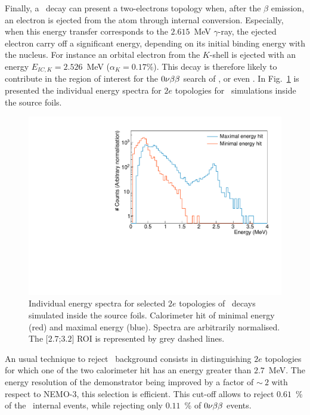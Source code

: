 Finally, a \Tl\ decay can present a two-electrons topology when, after the $\beta$ emission, an electron is ejected from the atom through internal conversion.
Especially, when this energy transfer corresponds to the $2.615$~MeV $\gamma$-ray, the ejected electron carry off a significant energy, depending on its initial binding energy with the nucleus.
For instance an orbital electron from the $K$-shell is ejected with an energy $E_{IC,K}=2.526$~MeV (${\alpha_{K}=0.17}$\%).
This decay is therefore likely to contribute in the region of interest for the $0\nu\beta\beta$ search of \Se, or even \Nd.
In Fig.~\ref{fig:Emin_Emax_Tl} is presented the individual energy spectra for $2e$ topologies for \Tl\ simulations inside the source foils.
\begin{figure}[!h]
  \centering
  \includegraphics[width=13cm]{timedifference/fig_timediff/energy_spect_min_max_208Tl.pdf}
  \caption{Individual energy spectra for selected $2e$ topologies of \Tl\ decays simulated inside the source foils.
    Calorimeter hit of minimal energy (red) and maximal energy (blue).
    Spectra are arbitrarily normalised.
    The [$2.7$;$3.2$] ROI is represented by grey dashed lines.
    \label{fig:Emin_Emax_Tl}}
\end{figure}

An usual technique to reject \Tl\ background consists in distinguishing $2e$ topologies for which one of the two calorimeter hit has an energy greater than $2.7$~MeV.
The energy resolution of the demonstrator being improved by a factor of $\sim~2$ with respect to NEMO-$3$, this selection is efficient.
This cut-off allows to reject $0.61$~\% of the \Tl\ internal events, while rejecting only $0.11$~\% of $0\nu\beta\beta$ events.

